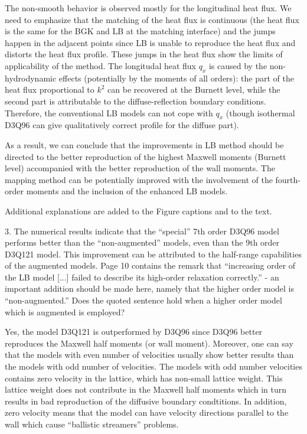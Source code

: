 \documentclass{article}
\begin{document}
The non-smooth behavior is observed mostly for the longitudinal heat flux.
We need to emphasize that the matching of the heat flux is continuous
(the heat flux is the same for the BGK and LB at the matching interface)
and the jumps happen in the adjacent points
since LB is unable to reproduce the heat flux and distorts the heat flux profile.
These jumps in the heat flux show the limits of applicability of the method.
The longitudal heat flux $q_x$ is caused by the non-hydrodynamic effects
(potentially by the moments of all orders):
the part of the heat flux proportional to $k^2$ can be recovered at the Burnett level,
while the second part is attributable to the diffuse-reflection boundary conditions.
Therefore, the conventional LB models can not cope with $q_x$
(though isothermal D3Q96 can give qualitatively correct profile for the diffuse part).

As a result, we can conclude that the improvements in LB method should be directed
to the better reproduction of the highest Maxwell moments (Burnett level)
accompanied with the better reproduction of the wall moments.
The mapping method can be potentially improved with the involvement of the fourth-order moments
and the inclusion of the enhanced LB models.

Additional explanations are added to the Figure captions and to the text.

\begin{leftbar}
\end{leftbar}

\begin{quoting}
    3. The numerical results indicate that the ``special''
    7th order D3Q96 model performs better than the
    ``non-augmented'' models, even than the 9th order
    D3Q121 model. This improvement can be attributed to
    the half-range capabilities of the augmented models.
    Page 10 contains the remark that ``increasing order of
    the LB model [...] failed to describe its high-order
    relaxation correctly.'' - an important addition should
    be made here, namely that the higher order model is
    ``non-augmented.'' Does the quoted sentence hold when
    a higher order model which is augmented is employed?
\end{quoting}

Yes, the model D3Q121 is outperformed by D3Q96
since D3Q96 better reproduces the Maxwell half moments (or wall moment).
Moreover, one can say that the models with even number of velocities usually show better results
than the models with odd number of velocities.
The models with odd number velocities contains zero velocity in the lattice,
which has non-small lattice weight.
This lattice weight does not contribute in the Maxwell half moments
which in turn results in bad reproduction of the diffusive boundary condtitions.
In addition, zero velocity means that the model can have velocity directions parallel to the wall
which cause ``ballistic streamers'' problems.
\end{document}
